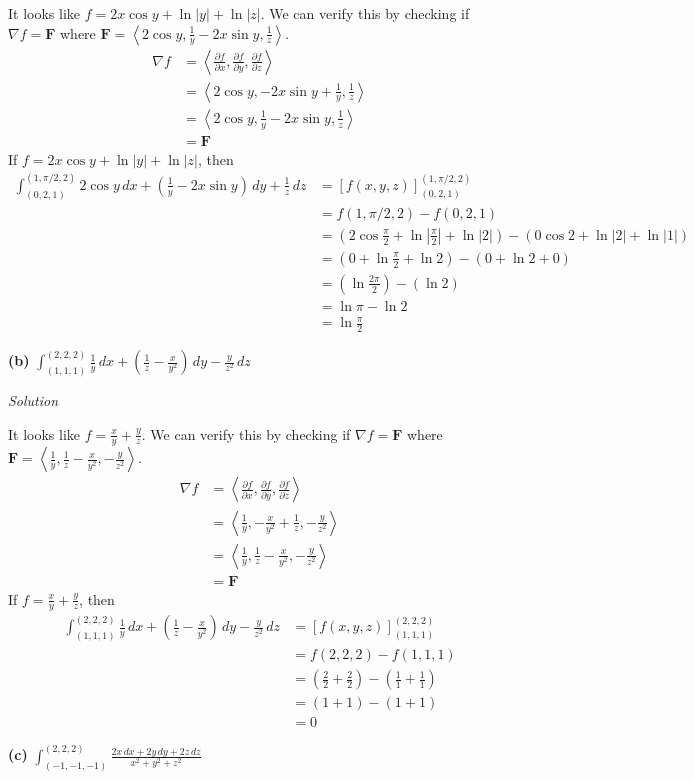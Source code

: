 \documentclass{article}
\newcommand{\lrp}[1]{\left( #1 \right)}
\newcommand{\lra}[1]{\left\langle #1 \right\rangle}
\newcommand{\lrb}[1]{\left[ #1 \right]}
\newcommand{\F}[0]{\mathbf{F}}
\newcommand{\Solution}{\textit{Solution}}
\begin{document}
It looks like $\displaystyle f = 2x\cos y + \ln \left|y\right| + \ln \left|z\right|$. We can verify this by checking if $\nabla f = \F$ where $\displaystyle \F = \lra{2\cos y, \frac{1}{y}-2x\sin y, \frac{1}{z}}$.
\begin{align*}
     \nabla f &=\lra{\frac{\partial f}{\partial x}, \frac{\partial f}{\partial y}, \frac{\partial f}{\partial z}}\\
     &=\lra{2\cos y, -2x\sin y + \frac{1}{y}, \frac{1}{z}}\\
     &=\lra{2\cos y,  \frac{1}{y}-2x\sin y, \frac{1}{z}}\\
     &=\F
\end{align*}
If  $\displaystyle f = 2x\cos y + \ln \left|y\right| + \ln \left|z\right|$, then
\begin{align*}
    \int_{(0,2,1)}^{(1,\pi/2,2)} 2\cos y\,dx+\lrp{\frac{1}{y}-2x\sin y}\,dy+\frac{1}{z}\,dz &= \lrb{f(x,y,z)}_{(0,2,1)}^{(1,\pi/2, 2)}\\
    &=f(1,\pi/2, 2) - f(0,2,1)\\
    &=\lrp{2\cos \frac{\pi}{2} + \ln \left|\frac{\pi}{2}\right| + \ln \left|2\right|}-\lrp{0\cos 2 + \ln \left|2\right| + \ln \left|1 \right|}\\
    &=\lrp{0 + \ln \frac{\pi}{2}+ \ln 2} - \lrp{0 + \ln 2 + 0}\\
    &=\lrp{\ln \frac{2\pi}{2}}-\lrp{\ln 2}\tag{property of $\ln$}\\
    &=\ln \pi - \ln 2\\
    &=\boxed{\ln \frac{\pi}{2}}\tag{property of $\ln$}
\end{align*}
{}\textbf{(b)} $\displaystyle \int_{(1,1,1)}^{(2,2,2)}\frac{1}{y}\,dx+\lrp{\frac{1}{z}-\frac{x}{y^2}}\,dy-\frac{y}{z^2}\,dz$

\Solution

It looks like $\displaystyle f = \frac{x}{y} + \frac{y}{z}$. We can verify this by checking if $\nabla f=\F$ where $\displaystyle \F=\lra{\frac{1}{y},\frac{1}{z}-\frac{x}{y^2},-\frac{y}{z^2}}$.
\begin{align*}
    \nabla f &=\lra{\frac{\partial f}{\partial x}, \frac{\partial f}{\partial y}, \frac{\partial f}{\partial z}}\\
    &=\lra{\frac{1}{y},-\frac{x}{y^2}+\frac{1}{z}, -\frac{y}{z^2}}\\
    &=\lra{\frac{1}{y},\frac{1}{z}-\frac{x}{y^2}, -\frac{y}{z^2}}\\
    &=\F
\end{align*}
If $\displaystyle f = \frac{x}{y} + \frac{y}{z}$, then
\begin{align*}
    \int_{(1,1,1)}^{(2,2,2)}\frac{1}{y}\,dx+\lrp{\frac{1}{z}-\frac{x}{y^2}}\,dy-\frac{y}{z^2}\,dz&= \lrb{f(x,y,z)}_{(1,1,1)}^{(2,2,2)}\\
    &=f(2,2,2)-f(1,1,1)\\
    &=\lrp{\frac{2}{2}+\frac{2}{2}}-\lrp{\frac{1}{1}+\frac{1}{1}}\\
    &=\lrp{1+1}-\lrp{1+1}\\
    &=\boxed{0}
\end{align*}
{}\textbf{(c)} $\displaystyle \int_{(-1,-1,-1)}^{(2,2,2)}\frac{2x\,dx+2y\,dy+2z\,dz}{x^2+y^2+z^2}$
\end{document}
